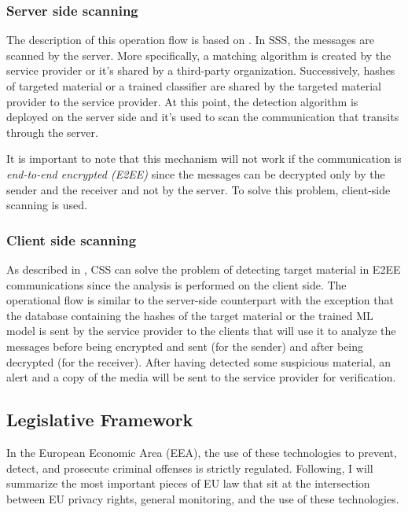 \subsubsection*{Server side scanning}

The description of this operation flow is based on \cite{abelson2024bugs}. In SSS, the messages are scanned by the server. More specifically, a matching algorithm is created by the service provider or it's shared by a third-party organization. Successively, hashes of targeted material or a trained classifier are shared by the targeted material provider to the service provider. At this point, the detection algorithm is deployed on the server side and it's used to scan the communication that transits through the server. 

It is important to note that this mechanism will not work if the communication is \textit{end-to-end encrypted (E2EE)} since the messages can be decrypted only by the sender and the receiver and not by the server. To solve this problem, client-side scanning is used.

\subsubsection*{Client side scanning}

As described in \cite{abelson2024bugs}, CSS can solve the problem of detecting target material in E2EE communications since the analysis is performed on the client side. The operational flow is similar to the server-side counterpart with the exception that the database containing the hashes of the target material or the trained ML model is sent by the service provider to the clients that will use it to analyze the messages before being encrypted and sent (for the sender) and after being decrypted (for the receiver)\cite{abelson2024bugs}. After having detected some suspicious material, an alert and a copy of the media will be sent to the service provider for verification.

\subsection{Legislative Framework}
\label{ss:leg_frame}

In the European Economic Area (EEA), the use of these technologies to prevent, detect, and prosecute criminal offenses is strictly regulated. Following, I will summarize the most important pieces of EU law that sit at the intersection between EU privacy rights, general monitoring, and the use of these technologies.

